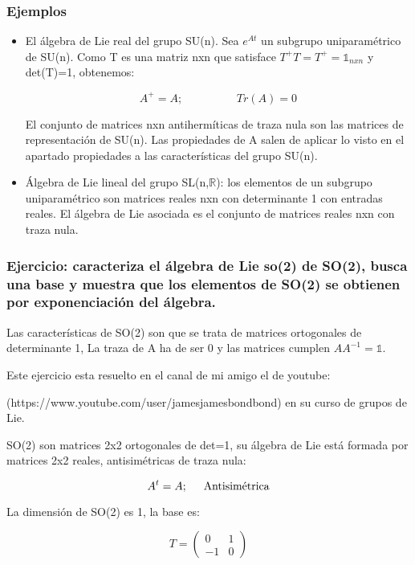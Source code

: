 \documentclass{article}
\begin{document}
\subsubsection{Ejemplos}

\begin{itemize}
 \item El álgebra de Lie real del grupo SU(n). Sea $e^{At}$ un subgrupo uniparamétrico de SU(n). Como T es una matriz nxn que satisface $T^+T=T^+=\mathds{1}_{nxn}$ y det(T)=1, obtenemos:

 $$A^+=A; \hspace{2cm} Tr(A)=0$$

 El conjunto de matrices nxn antihermíticas de traza nula son las matrices de representación de SU(n). Las propiedades de A salen de aplicar lo visto en el apartado propiedades a las características del grupo SU(n).

 \item Álgebra de Lie lineal del grupo SL(n,$\mathds{R}$): los elementos de un subgrupo uniparamétrico son matrices reales nxn con determinante 1 con entradas reales. El álgebra de Lie asociada es el conjunto de matrices reales nxn con traza nula.
\end{itemize}

\subsubsection{Ejercicio: caracteriza el álgebra de Lie so(2) de SO(2), busca una base y muestra que los elementos de SO(2) se obtienen por exponenciación del álgebra.}


Las características de SO(2) son que se trata de matrices ortogonales de determinante 1, La traza de A ha de ser 0 y las matrices cumplen $AA^{-1}=\mathds{1}$.

Este ejercicio esta resuelto en el canal de mi amigo el de youtube:

(https://www.youtube.com/user/jamesjamesbondbond) en su curso de grupos de Lie.

\smallskip
SO(2) son matrices 2x2 ortogonales de det=1, su álgebra de Lie está formada por matrices 2x2 reales, antisimétricas de traza nula:

$$A^t=A; \hspace{0.5cm} \text{Antisimétrica}$$

La dimensión de SO(2) es 1, la base es:

$$T=\left ( \begin{array}{cc}
 0 &  1\\
 -1 & 0
\end{array}\right)$$
\end{document}
